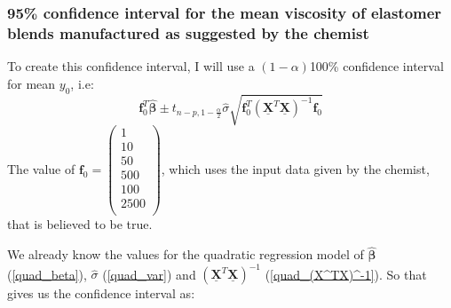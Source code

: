 \documentclass[12pt]{article}
\newcommand{\vect}[1]{\boldsymbol{#1}}
\newcommand{\mat}[1]{\underline{\boldsymbol{#1}}}
\newcommand{\trans}[1]{#1^T}
\newcommand{\est}[1]{\hat{#1}}
\begin{document}
\subsubsection{95\% confidence interval for the mean viscosity of elastomer blends manufactured as suggested by the chemist}
To create this confidence interval, I will use a $(1-\alpha)$100\% confidence interval for mean $y_0$, i.e:
\begin{equation} \label{confidence_interval}
  \trans{\vect{f}_0}\est{\vect{\beta}} \pm
  t_{n-p,1-\frac{\alpha}{2}}\est{\sigma}\sqrt{\trans{\vect{f}_0}(\trans{\mat{X}}\mat{X})^{-1}\vect{f}_0}
\end{equation}
The value of
$\vect{f}_0 =
\begin{pmatrix}
  1     \\
  10    \\
  50    \\
  500   \\
  100   \\
  2500  \\
\end{pmatrix}$, which uses the input data given by the chemist, that is believed to be true. \par
We already know the values for the quadratic regression model of $\est{\vect{\beta}}$ (\ref{quad_beta}), $\est{\sigma}$ (\ref{quad_var}) and $(\trans{\mat{X}}\mat{X})^{-1}$ (\ref{quad_(X^TX)^-1}). So that gives us the confidence interval as:
\end{document}
